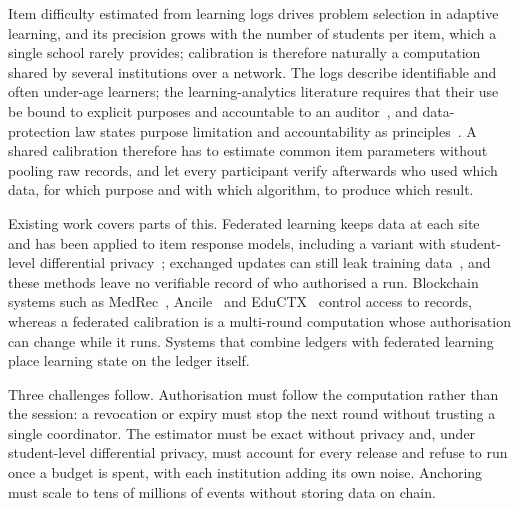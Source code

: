 \documentclass[pdflatex,iicol,sn-mathphys-num]{sn-jnl}
\theoremstyle{thmstyleone}
\begin{document}
Item difficulty estimated from learning logs drives problem selection in adaptive learning, and its precision grows with the number of students per item, which a single school rarely provides; calibration is therefore naturally a computation shared by several institutions over a network. The logs describe identifiable and often under-age learners; the learning-analytics literature requires that their use be bound to explicit purposes and accountable to an auditor~\cite{pardo2014ethical,drachsler2016delicate,prinsloo2015self}, and data-protection law states purpose limitation and accountability as principles~\cite{gdpr2016}. A shared calibration therefore has to estimate common item parameters without pooling raw records, and let every participant verify afterwards who used which data, for which purpose and with which algorithm, to produce which result.

Existing work covers parts of this. Federated learning keeps data at each site~\cite{mcmahan2017communication,kairouz2021advances} and has been applied to item response models, including a variant with student-level differential privacy~\cite{zhou2025federated}; exchanged updates can still leak training data~\cite{zhu2019deep,shokri2017membership}, and these methods leave no verifiable record of who authorised a run. Blockchain systems such as MedRec~\cite{azaria2016medrec}, Ancile~\cite{dagher2018ancile} and EduCTX~\cite{turkanovic2018eductx} control access to records, whereas a federated calibration is a multi-round computation whose authorisation can change while it runs. Systems that combine ledgers with federated learning~\cite{kim2020blockchained,shayan2021biscotti} place learning state on the ledger itself.

Three challenges follow. Authorisation must follow the computation rather than the session: a revocation or expiry must stop the next round without trusting a single coordinator. The estimator must be exact without privacy and, under student-level differential privacy, must account for every release and refuse to run once a budget is spent, with each institution adding its own noise. Anchoring must scale to tens of millions of events without storing data on chain.
\end{document}
